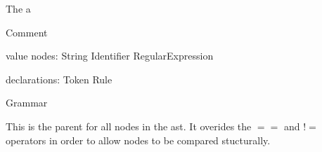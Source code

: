 The a


Comment

value nodes:
    String
    Identifier
    RegularExpression

declarations:
    Token
    Rule

Grammar







This is the parent for all nodes in the ast. It overides the $==$ and $!=$ operators in order to allow nodes to be compared stucturally.
